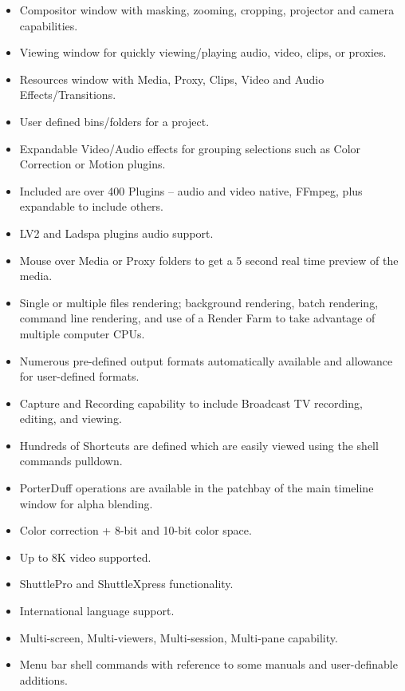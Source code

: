 \begin{description}
\begin{itemize}
                \item Compositor window with masking, zooming, cropping, projector and camera capabilities.
                \item Viewing window for quickly viewing/playing audio, video, clips, or proxies.
                \item Resources window with Media, Proxy, Clips, Video and Audio Effects/Transitions.
                \item User defined bins/folders for a project.
                \item Expandable Video/Audio effects for grouping selections such as Color Correction or Motion plugins.
                \item Included are over 400 Plugins – audio and video native, FFmpeg, plus expandable to include others.
                \item LV2 and Ladspa plugins audio support.
                \item Mouse over Media or Proxy folders to get a 5 second real time preview of the media.
                \item Single or multiple files rendering; background rendering, batch rendering, command line rendering, and use of a Render Farm to take advantage of multiple computer CPUs.
                \item Numerous pre-defined output formats automatically available and allowance for user-defined formats.
                \item Capture and Recording capability to include Broadcast TV recording, editing, and viewing.
                \item Hundreds of Shortcuts are defined which are easily viewed using the shell commands pulldown.
                \item PorterDuff operations are available in the patchbay of the main timeline window for alpha blending.
                \item Color correction + 8-bit and 10-bit color space.
                \item Up to 8K video supported.
                \item ShuttlePro and ShuttleXpress functionality.
                \item International language support.
                \item Multi-screen, Multi-viewers, Multi-session, Multi-pane capability.
                \item Menu bar shell commands with reference to some manuals and user-definable additions.

\end{itemize}
\end{description}
